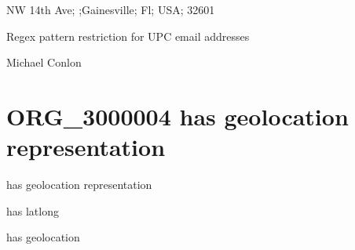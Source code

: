 \documentclass[letterpaper,10pt,english]{sphinxmanual}
\begin{document}
\begin{sphinxShadowBox}

 NW 14th Ave; ;Gainesville; Fl; USA; 32601
\end{sphinxShadowBox}

\begin{sphinxShadowBox}

\sphinxAtStartPar
Regex pattern restriction for UPC email addresses
\end{sphinxShadowBox}

\begin{sphinxShadowBox}

\sphinxAtStartPar
Michael Conlon 
\end{sphinxShadowBox}
\begin{quote}

\ignorespaces \end{quote}


\section{ORG\_3000004 \sphinxhyphen{} has geolocation representation}
\label{\detokenize{doc-ORG_3000004:org-3000004-has-geolocation-representation}}\label{\detokenize{doc-ORG_3000004:index-0}}\label{\detokenize{doc-ORG_3000004::doc}}
\begin{sphinxShadowBox}

\sphinxAtStartPar
has geolocation representation
\end{sphinxShadowBox}

\begin{sphinxShadowBox}

\sphinxAtStartPar
has latlong
\end{sphinxShadowBox}

\begin{sphinxShadowBox}

\sphinxAtStartPar
has geolocation
\end{sphinxShadowBox}

\begin{sphinxShadowBox}

\sphinxAtStartPar
{\hyperref[\detokenize{doc-OBI_0002815::doc}]{}}
\end{sphinxShadowBox}
\end{document}
